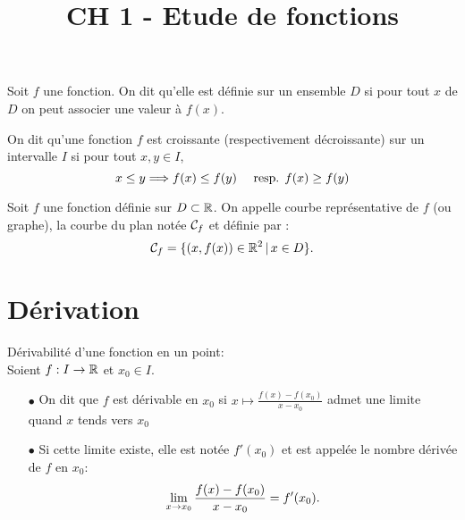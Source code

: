 \documentclass[a4paper, 11pt]{article}
\begin{document}
\title{CH 1 - Etude de fonctions}
\vspace{1cm}
\begin{defi}
Soit $f$ une fonction. On dit qu'elle est définie sur un ensemble $D$ si pour tout $x$ de $D$ on peut associer une valeur à $f(x)$. 
\end{defi}


\begin{defi}
On dit qu'une fonction $f$ est croissante (respectivement décroissante) sur un intervalle $I$ si pour tout $x,y\in I$, 
$$x\leq y \Longrightarrow f(x)\leq f(y) \quad \text{ resp. $f(x) \geq f(y)$} $$
\end{defi}

\begin{defi}
Soit $f$ une fonction définie sur $D\subset \mathbb{R}$. On appelle courbe représentative de $f$ (ou graphe), la courbe du plan notée $\mathcal{C}_f$ et définie par :
$$ \mathcal{C}_f = \{ (x,f(x)) \in \mathbb{R}^2 \, |\, x\in D\}.$$
\end{defi}

\vspace{1cm}
\section{Dérivation}


	\begin{defi} D\'erivabilit\'e d'une fonction en un point:\\
		\noindent Soient $f: I\rightarrow \mathbb{R}$ et $x_0\in I$. \vsec
		\begin{itemize}
			\item[$\bullet$] On dit que $f$ est d\'erivable en $x_0$ si 
   $x\mapsto \frac{f(x)-f(x_0)}{x-x_0}$ admet une limite quand $x$ tends vers $x_0$
			\item[$\bullet$] Si cette limite existe, elle est not\'ee $f'(x_0)$ et est appel\'ee le nombre d\'eriv\'ee de $f$ en $x_0$:
$$ \lim_{x\rightarrow x_0} \frac{f(x)-f(x_0)}{x-x_0} = f'(x_0).$$
\end{itemize}
	\end{defi}
 
\end{document}
